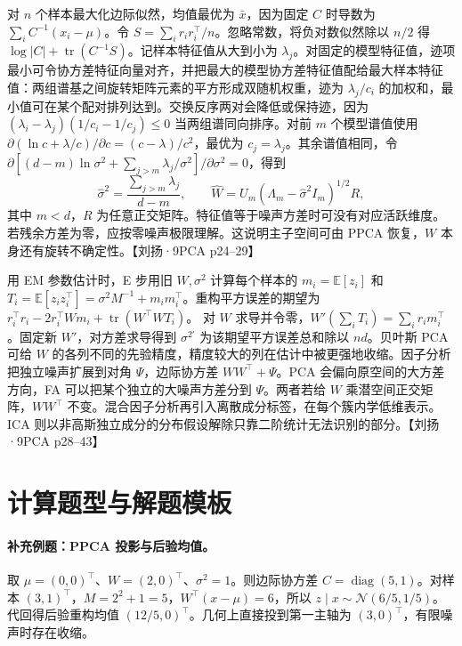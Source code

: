 \documentclass[UTF8,a4paper,zihao=-4,fontset=fandol]{ctexrep}
\begin{document}
对 $n$ 个样本最大化边际似然，均值最优为 $\bar x$，因为固定 $C$ 时导数为 $\sum_i C^{-1}(x_i-\mu)$。令 $S=\sum_i r_ir_i^\top/n$。忽略常数，将负对数似然除以 $n/2$ 得 $\log|C|+\operatorname{tr}(C^{-1}S)$。记样本特征值从大到小为 $\lambda_j$。对固定的模型特征值，迹项最小可令协方差特征向量对齐，并把最大的模型协方差特征值配给最大样本特征值：两组谱基之间旋转矩阵元素的平方形成双随机权重，迹为 $\lambda_j/c_i$ 的加权和，最小值可在某个配对排列达到。交换反序两对会降低或保持迹，因为 $(\lambda_i-\lambda_j)(1/c_i-1/c_j)\le0$ 当两组谱同向排序。对前 $m$ 个模型谱值使用 $\partial(\ln c+\lambda/c)/\partial c=(c-\lambda)/c^2$，最优为 $c_j=\lambda_j$。其余谱值相同，令
$\partial[(d-m)\ln\sigma^2+\sum_{j>m}\lambda_j/\sigma^2]/\partial\sigma^2=0$，得到
\[
\widehat{\sigma}^2=\frac{\sum_{j>m}\lambda_j}{d-m},\qquad
\widehat W=U_m(\Lambda_m-\widehat{\sigma}^2I_m)^{1/2}R,
\]
其中 $m<d$，$R$ 为任意正交矩阵。特征值等于噪声方差时可没有对应活跃维度。若残余方差为零，应按零噪声极限理解。这说明主子空间可由 PPCA 恢复，$W$ 本身还有旋转不确定性。【刘扬·9PCA p24–29】

用 EM 参数估计时，E 步用旧 $W,\sigma^2$ 计算每个样本的 $m_i=\mathbb E[z_i]$ 和 $T_i=\mathbb E[z_i z_i^\top]=\sigma^2 M^{-1}+m_im_i^\top$。重构平方误差的期望为
$r_i^\top r_i-2r_i^\top Wm_i+\operatorname{tr}(W^\top WT_i)$。
对 $W$ 求导并令零，$W'(\sum_i T_i)=\sum_i r_im_i^\top$。固定新 $W'$，对方差求导得到 $\sigma^{2\prime}$ 为该期望平方误差总和除以 $nd$。贝叶斯 PCA 可给 $W$ 的各列不同的先验精度，精度较大的列在估计中被更强地收缩。因子分析把独立噪声扩展到对角 $\Psi$，边际协方差 $WW^\top+\Psi$。PCA 会偏向原空间的大方差方向，FA 可以把某个独立的大噪声方差分到 $\Psi$。两者若给 $W$ 乘潜空间正交矩阵，$WW^\top$ 不变。混合因子分析再引入离散成分标签，在每个簇内学低维表示。ICA 则以非高斯独立成分的分布假设解除只靠二阶统计无法识别的部分。【刘扬·9PCA p28–43】

\section{计算题型与解题模板}

\paragraph{补充例题：PPCA 投影与后验均值。}
取 $\mu=(0,0)^\top$、$W=(2,0)^\top$、$\sigma^2=1$。则边际协方差 $C=\operatorname{diag}(5,1)$。对样本 $(3,1)^\top$，$M=2^2+1=5$，$W^\top(x-\mu)=6$，所以 $z\mid x\sim\mathcal N(6/5,1/5)$。代回得后验重构均值 $(12/5,0)^\top$。几何上直接投到第一主轴为 $(3,0)^\top$，有限噪声时存在收缩。
\end{document}
